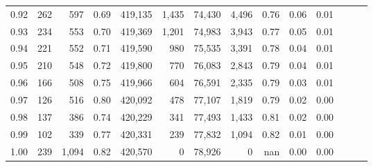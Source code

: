 \begin{tabular}{rrrrrrrrrrrrrr}
0.92 &    262 &    597 &  0.69 &  419,135 &    1,435 &  74,430 &   4,496 &  0.76 &  0.06 &      0.01 \\
0.93 &    234 &    553 &  0.70 &  419,369 &    1,201 &  74,983 &   3,943 &  0.77 &  0.05 &      0.01 \\
0.94 &    221 &    552 &  0.71 &  419,590 &      980 &  75,535 &   3,391 &  0.78 &  0.04 &      0.01 \\
0.95 &    210 &    548 &  0.72 &  419,800 &      770 &  76,083 &   2,843 &  0.79 &  0.04 &      0.01 \\
0.96 &    166 &    508 &  0.75 &  419,966 &      604 &  76,591 &   2,335 &  0.79 &  0.03 &      0.01 \\
0.97 &    126 &    516 &  0.80 &  420,092 &      478 &  77,107 &   1,819 &  0.79 &  0.02 &      0.00 \\
0.98 &    137 &    386 &  0.74 &  420,229 &      341 &  77,493 &   1,433 &  0.81 &  0.02 &      0.00 \\
0.99 &    102 &    339 &  0.77 &  420,331 &      239 &  77,832 &   1,094 &  0.82 &  0.01 &      0.00 \\
1.00 &    239 &  1,094 &  0.82 &  420,570 &        0 &  78,926 &       0 &   nan &  0.00 &      0.00 \\
\bottomrule
\end{tabular}
